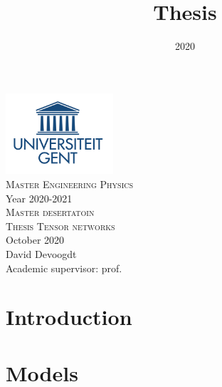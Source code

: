 \documentclass{article}
\title{Thesis}
\date{2020}
\begin{document}



\onecolumn
\begin{titlepage}
	\begin{center}

		\includegraphics[width=4cm]{Figuren/UGent.png} \\[0.5cm]    %

		\Large{\textsc{Master Engineering Physics}} \\[0.5cm]  %

		\normalsize{Year 2020-2021} \\[3cm]  %

		\huge{\textsc{Master desertatoin}} \\[0.25cm]   %

		\Large{\textsc{Thesis Tensor networks}}\\[0.25cm]

		\large \textnormal{October 2020} \\[2.5cm]   %


		David Devoogdt \\       [2.5cm]


		Academic supervisor: prof.




		\vfill

	\end{center}
\end{titlepage}

\tableofcontents

\newpage
\listoftodos
\newpage

{}



\section{Introduction}


\section{Models}

\end{document}

